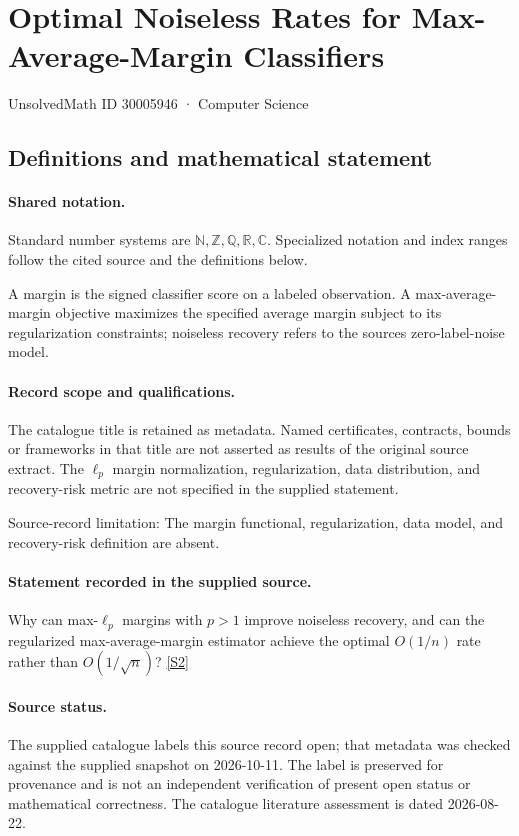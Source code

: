 \documentclass[11pt]{article}
\newcommand{\sref}[2]{\hyperlink{source:#1:#2}{[S#2]}}
\begin{document}
\setcounter{section}{30005945}
\section{Optimal Noiseless Rates for Max-Average-Margin Classifiers}\label{30005946}
{\small\sffamily UnsolvedMath ID 30005946 · Computer Science}
\subsection{Definitions and mathematical statement}

\paragraph{Shared notation.}Standard number systems are $\mathbb N,\mathbb Z,\mathbb Q,\mathbb R,\mathbb C$. Specialized notation and index ranges follow the cited source and the definitions below.


A margin is the signed classifier score on a labeled observation. A max-average-margin objective maximizes the specified average margin subject to its regularization constraints; noiseless recovery refers to the source\textquotesingle s zero-label-noise model.
\paragraph{Record scope and qualifications.}
The catalogue title is retained as metadata. Named certificates, contracts, bounds or frameworks in that title are not asserted as results of the original source extract.
The $\ell_p$ margin normalization, regularization, data distribution, and recovery-risk metric are not specified in the supplied statement.

Source-record limitation: The margin functional, regularization, data model, and recovery-risk definition are absent.
\paragraph{Statement recorded in the supplied source.}
Why can max-$\ell_p$ margins with $p>1$ improve noiseless recovery, and can the regularized max-average-margin estimator achieve the optimal $O(1/n)$ rate rather than $O(1/\sqrt n)$? \sref{30005946}{2}
\paragraph{Source status.}
The supplied catalogue labels this source record open; that metadata was checked against the supplied snapshot on 2026-10-11. The label is preserved for provenance and is not an independent verification of present open status or mathematical correctness. The catalogue literature assessment is dated 2026-08-22.
\end{document}
